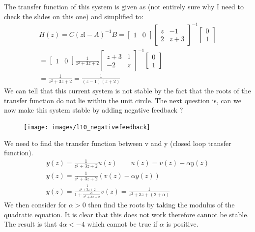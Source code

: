 \documentclass[a4paper,11pt]{article}
\begin{document}
		The transfer function of this system is given as (not entirely sure why I need to check the slides on this one) and simplified to:
		\begin{gather}
			H(z)=C(z\mathbb{I}-A )^{-1}B = 
			\begin{bmatrix}
				1 & 0 
			\end{bmatrix}
			\begin{bmatrix}
				z & -1 \\
				2 & z+3 
			\end{bmatrix}^{-1}
			\begin{bmatrix}
				0 \\ 1 
			\end{bmatrix}\\
			=
			\begin{bmatrix}
				1 & 0 
			\end{bmatrix}
			\frac{1}{z^2+3z+2}
			\begin{bmatrix}
				z+3 & 1 \\
				-2 & z 
			\end{bmatrix}^{-1}
			\begin{bmatrix}
				0 \\ 1 
			\end{bmatrix}\\
			= \frac{1}{z^2+3z+2} = \frac{1}{(z-1)(z+2)}
		\end{gather}
		We can tell that this current system is not stable by the fact that the roots of the transfer function do not lie within the unit circle. The next question is, can we now make this system stable by adding negative feedback ?


	\begin{figure}[htp]
		\centering
		\texttt{[image: images/l10\_negativefeedback]}
	\end{figure}
	\FloatBarrier
	We need to find the transfer function between v and y (closed loop transfer function).
	\begin{gather}
		y(z) = \frac{1}{z^2+3z+2}u(z)
		\qquad
		u(z) = v(z)-\alpha y(z)\\
		y(z) = \frac{1}{z^2+3z+2}(v(z)-\alpha y(z))\\
		y(z) = \frac{\frac{1}{z^2+3z+2}}{1+\frac{\alpha}{z^2+3z+2}}v(z) = \frac{1}{z^2+3z+(2+\alpha)}
	\end{gather}
	We then consider for $\alpha > 0 $ then find the roots by taking the modulus of the quadratic equation. It is clear that this does not work therefore cannot be stable. The result is that $4\alpha <-4$ which cannot be true if $\alpha$ is positive.\\\\
\end{document}
